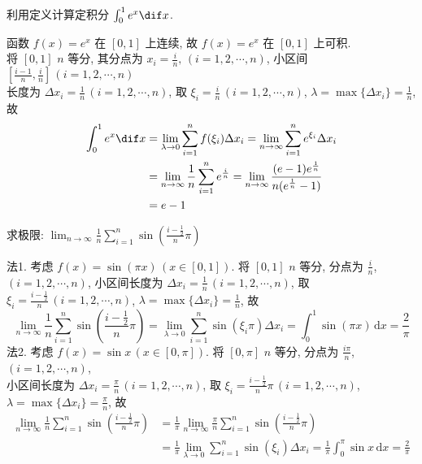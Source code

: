 \documentclass[color=green,titlestyle=hang]{elegantbook}%
\begin{document}
\begin{example}
利用定义计算定积分 $\int_0^1e^x\dif x$.
\end{example}\begin{solution}
函数 $f(x)=e^x$ 在 $[0,1]$ 上连续, 故 $f(x)=e^x$ 在  $[0,1]$  上可积.\\
将 $[0,1]$ $n$ 等分, 其分点为 $x_i=\frac{i}{n},\,(i=1,2,\cdots,n)$, 小区间 $\left[\frac{i-1}{n},\frac{i}{n}\right]\,(i=1,2,\cdots,n)$ \\
长度为 $\Delta x_i=\frac{1}{n}\,(i=1,2,\cdots,n)$, 
取 $\xi_i=\frac{i}{n}\,(i=1,2,\cdots,n)$, $\lambda=\max\{\Delta x_i\}=\frac{1}{n}$, 故
\begin{align*}
\int_0^1e^x\dif x
&=\lim_{\lambda\to0}\sum_{i=1}^{n}f(\xi_i)\Delta x_i=\lim_{n\to\infty}\sum_{i=1}^{n}e^{\xi_i}\Delta x_i\\
&=\lim_{n\to\infty}\frac{1}{n}\sum_{i=1}^{n}e^{\frac{i}{n}}=\lim_{n\to\infty}\frac{(e-1)e^{\frac{1}{n}}}{n(e^{\frac{1}{n}}-1)}\\
&=e-1
\end{align*}	
\end{solution}

\begin{exercise}求极限: $\lim_{n\to\infty}\frac{1}{n}\sum_{i=1}^{n}\sin\left(\frac{i-\frac{1}{2}}{n}\pi\right)$
\end{exercise}
\begin{solution}法1. 考虑 $f(x)=\sin(\pi x)\,(x\in[0,1])$. 将 $[0,1]$ $n$ 等分, 分点为 $\frac{i}{n}$, $(i=1,2,\cdots,n)$, 小区间长度为 $\Delta x_i=\frac{1}{n}\,(i=1,2,\cdots,n)$, 取 $\xi_i=\frac{i-\frac{1}{2}}{n}\,(i=1,2,\cdots,n)$, $\lambda=\max\{\Delta x_i\}=\frac{1}{n}$,  故\[\lim_{n\to\infty}\frac{1}{n}\sum_{i=1}^{n}\sin\left(\frac{i-\frac{1}{2}}{n}\pi\right)=\lim_{\lambda\to0}\sum_{i=1}^{n}\sin(\xi_i \pi)\Delta x_i=\int_0^1\sin(\pi x)\,\mathrm{d}x=\frac{2}{\pi}\]	
法2. 考虑 $f(x)=\sin x\,(x\in[0,\pi])$. 将 $[0,\pi]$ $n$ 等分, 分点为 $\frac{i\pi}{n}$, $(i=1,2,\cdots,n)$, \\
小区间长度为 $\Delta x_i=\frac{\pi}{n}\,(i=1,2,\cdots,n)$, 取 $\xi_i=\frac{i-\frac{1}{2}}{n}\pi\,(i=1,2,\cdots,n)$, $\lambda=\max\{\Delta x_i\}=\frac{\pi}{n}$,  
故\begin{align*}
\lim_{n\to\infty}\frac{1}{n}\sum_{i=1}^{n}\sin\left(\frac{i-\frac{1}{2}}{n}\pi\right)
&=\frac{1}{\pi}\lim_{n\to\infty}\frac{\pi}{n}\sum_{i=1}^{n}\sin\left(\frac{i-\frac{1}{2}}{n}\pi\right)\\
&=\frac{1}{\pi}\lim_{\lambda\to0}\sum_{i=1}^{n}\sin(\xi_i )\Delta x_i=\frac{1}{\pi}\int_0^\pi\sin x\,\mathrm{d}x=\frac{2}{\pi}
\end{align*}	
\end{solution}
\end{document}
